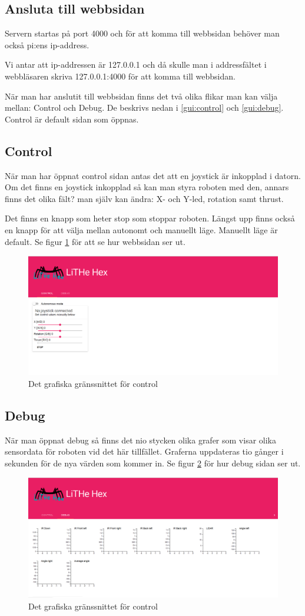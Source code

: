 \documentclass[a4paper,titlepage,12pt]{article}
\begin{document}
	\subsection{Ansluta till webbsidan}
	Servern startas på port 4000 och för att komma till webbsidan behöver man också pi:ens ip-address. 
	
	Vi antar att ip-addressen är 127.0.0.1 och då skulle man i addressfältet i webbläsaren skriva
	127.0.0.1:4000 för att komma till webbsidan.
	
	När man har anslutit till webbsidan finns det två olika flikar man kan välja mellan: Control och Debug. De beskrivs nedan i \ref{gui:control} och \ref{gui:debug}. Control är default sidan som öppnas.
	
	\label{gui:control}
	\subsection{Control}
	När man har öppnat control sidan antas det att en joystick är inkopplad i datorn. Om det finns en joystick inkopplad så kan man styra roboten med den, annars finns det olika fält? man själv kan ändra: X- och Y-led, rotation samt thrust.
	
	Det finns en knapp som heter stop som stoppar roboten. Längst upp finns också en knapp för att välja mellan autonomt och manuellt läge. Manuellt läge är default. Se figur \ref{fig:gui-front} för att se hur webbsidan ser ut.
	
	\begin{figure}[h]
		\centering
		\includegraphics[width=0.5\linewidth]{images/gui-front.png}
		\caption{Det grafiska gränssnittet för control\label{fig:gui-front}}
	\end{figure}
	
	\label{gui:debug}
	\subsection{Debug}
	När man öppnat debug så finns det nio stycken olika grafer som visar olika sensordata för roboten vid det här tillfället. Graferna uppdateras tio gånger i sekunden för de nya värden som kommer in. Se figur \ref{fig:gui-debug} för hur debug sidan ser ut.
	
	\begin{figure}[h]
		\centering
		\includegraphics[width=0.5\linewidth]{images/gui-debug.png}
		\caption{Det grafiska gränssnittet för control\label{fig:gui-debug}}
	\end{figure}
	
\end{document}
